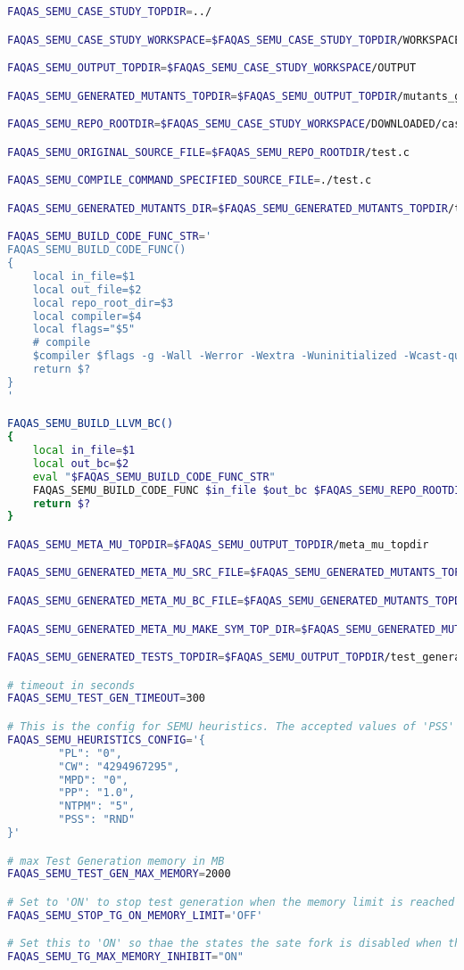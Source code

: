 \begin{lstlisting}[language=bash,label=listing:ASN:conf_1,caption=faqas\_semus\_conf.sh file for ASN case study.]
FAQAS_SEMU_CASE_STUDY_TOPDIR=../

FAQAS_SEMU_CASE_STUDY_WORKSPACE=$FAQAS_SEMU_CASE_STUDY_TOPDIR/WORKSPACE

FAQAS_SEMU_OUTPUT_TOPDIR=$FAQAS_SEMU_CASE_STUDY_WORKSPACE/OUTPUT

FAQAS_SEMU_GENERATED_MUTANTS_TOPDIR=$FAQAS_SEMU_OUTPUT_TOPDIR/mutants_generation

FAQAS_SEMU_REPO_ROOTDIR=$FAQAS_SEMU_CASE_STUDY_WORKSPACE/DOWNLOADED/casestudy

FAQAS_SEMU_ORIGINAL_SOURCE_FILE=$FAQAS_SEMU_REPO_ROOTDIR/test.c

FAQAS_SEMU_COMPILE_COMMAND_SPECIFIED_SOURCE_FILE=./test.c

FAQAS_SEMU_GENERATED_MUTANTS_DIR=$FAQAS_SEMU_GENERATED_MUTANTS_TOPDIR/test

FAQAS_SEMU_BUILD_CODE_FUNC_STR='
FAQAS_SEMU_BUILD_CODE_FUNC()
{
    local in_file=$1
    local out_file=$2
    local repo_root_dir=$3
    local compiler=$4
    local flags="$5"
    # compile
    $compiler $flags -g -Wall -Werror -Wextra -Wuninitialized -Wcast-qual -Wshadow -Wundef -fdiagnostics-show-option -D_DEBUG -I $repo_root_dir -O0 $in_file -o $out_file $flags
    return $?
}
'

FAQAS_SEMU_BUILD_LLVM_BC()
{
    local in_file=$1
    local out_bc=$2
    eval "$FAQAS_SEMU_BUILD_CODE_FUNC_STR"
    FAQAS_SEMU_BUILD_CODE_FUNC $in_file $out_bc $FAQAS_SEMU_REPO_ROOTDIR clang '-c -emit-llvm'
    return $?
}

FAQAS_SEMU_META_MU_TOPDIR=$FAQAS_SEMU_OUTPUT_TOPDIR/meta_mu_topdir

FAQAS_SEMU_GENERATED_META_MU_SRC_FILE=$FAQAS_SEMU_GENERATED_MUTANTS_TOPDIR/test.MetaMu.c

FAQAS_SEMU_GENERATED_META_MU_BC_FILE=$FAQAS_SEMU_GENERATED_MUTANTS_TOPDIR/test.MetaMu.bc

FAQAS_SEMU_GENERATED_META_MU_MAKE_SYM_TOP_DIR=$FAQAS_SEMU_GENERATED_MUTANTS_TOPDIR/"MakeSym-TestGen-Input"

FAQAS_SEMU_GENERATED_TESTS_TOPDIR=$FAQAS_SEMU_OUTPUT_TOPDIR/test_generation

# timeout in seconds
FAQAS_SEMU_TEST_GEN_TIMEOUT=300

# This is the config for SEMU heuristics. The accepted values of 'PSS' are 'RND' for random and 'MDO' for minimum distance to output
FAQAS_SEMU_HEURISTICS_CONFIG='{
        "PL": "0",
        "CW": "4294967295",
        "MPD": "0",
        "PP": "1.0",
        "NTPM": "5",
        "PSS": "RND"
}'

# max Test Generation memory in MB
FAQAS_SEMU_TEST_GEN_MAX_MEMORY=2000

# Set to 'ON' to stop test generation when the memory limit is reached
FAQAS_SEMU_STOP_TG_ON_MEMORY_LIMIT='OFF'

# Set this to 'ON' so thae the states the sate fork is disabled when the memory limit is reached, to avoid going much over it
FAQAS_SEMU_TG_MAX_MEMORY_INHIBIT="ON"
\end{lstlisting}

